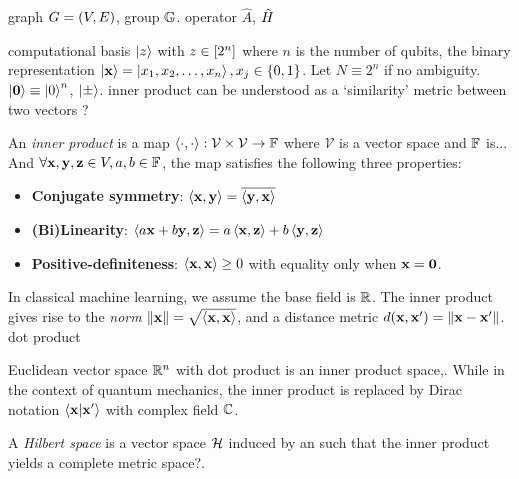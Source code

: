 graph $G=(V,E)$, group $\mathbb{G}$. 
operator $\hat{A}$, $\hat{H}$

computational basis $\ket{z}$ with $z\in \qty[2^n]$ where $n$ is the number of qubits,
the binary representation $\ket{\vb{x}}=\ket{x_1,x_2,\dots,x_n},x_j\in \qty{0,1}$. 
Let $N \equiv 2^n$ if no ambiguity.
$\ket{\vb{0}}\equiv\ket{0}^n$, $\ket{\pm}$.
inner product can be understood as a `similarity' metric between two vectors ?
\begin{definition}\label{def:inner_product}
	An \emph{inner product} is a map
	$\expval{\cdot,\cdot}: \mathcal{V} \times \mathcal{V} \to \mathbb{F}$
	where $\mathcal{V}$ is a vector space and $\mathbb{F}$ is...
	And $\forall \vb{x},\vb{y},\vb{z}\in V,a,b\in\mathbb{F}$, 
	the map satisfies the following three properties:
	\begin{itemize}
		\item \textbf{Conjugate symmetry}:
		$\expval{\vb{x},\vb{y}}=\overline{\expval{\vb{y},\vb{x}}}$
		\item \textbf{(Bi)Linearity}:
		$\expval{a\vb{x}+b\vb{y},\vb{z}}=a\expval{\vb{x},\vb{z}}+b\expval{\vb{y},\vb{z}}$
		\item \textbf{Positive-definiteness}:
		$\expval{\vb{x},\vb{x}}\ge 0$ with equality only when $\vb{x}=\vb{0}$.
	\end{itemize}
	In classical machine learning, we assume the base field is $\mathbb{R}$.
	The inner product gives rise to the \emph{norm} $\norm{\vb{x}}=\sqrt{\expval{\vb{x},\vb{x}}}$,
	and a distance metric $d(\vb{x},\vb{x}')=\norm{\vb{x}-\vb{x}'}$.
	dot product
\end{definition}
Euclidean vector space $\mathbb{R}^n$ with dot product is an inner product space,.
While in the context of quantum mechanics,
the inner product is replaced by 
Dirac notation $\braket{\vb{x}}{\vb{x}'}$ with complex field $\mathbb{C}$.
\begin{definition}\label{def:hilbert_space}
	A \emph{Hilbert space} is a vector space $\mathcal{H}$ induced by an 
	such that the inner product yields a complete metric space?.
\end{definition}

